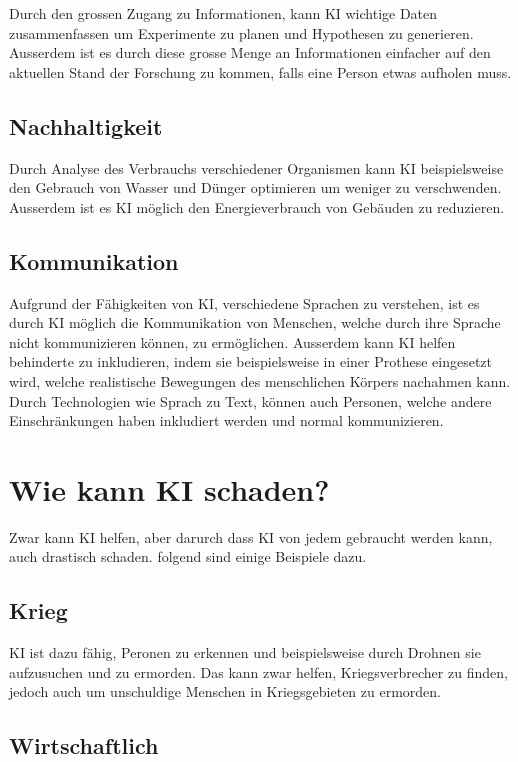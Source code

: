 \documentclass{report}
\begin{document}
Durch den grossen Zugang zu Informationen, kann KI wichtige Daten zusammenfassen um Experimente zu planen und Hypothesen zu generieren. Ausserdem ist es durch diese grosse Menge an Informationen einfacher auf den aktuellen Stand der Forschung zu kommen, falls eine Person etwas aufholen muss. 

\subsection{Nachhaltigkeit}

Durch Analyse des Verbrauchs verschiedener Organismen kann KI beispielsweise den Gebrauch von Wasser und Dünger optimieren um weniger zu verschwenden. Ausserdem ist es KI möglich den Energieverbrauch von Gebäuden zu reduzieren.

\subsection{Kommunikation}

Aufgrund der Fähigkeiten von KI, verschiedene Sprachen zu verstehen, ist es durch KI möglich die Kommunikation von Menschen, welche durch ihre Sprache nicht kommunizieren können, zu ermöglichen. Ausserdem kann KI helfen behinderte zu inkludieren, indem sie beispielsweise in einer Prothese eingesetzt wird, welche realistische Bewegungen des menschlichen Körpers nachahmen kann. Durch Technologien wie Sprach zu Text, können auch Personen, welche andere Einschränkungen haben inkludiert werden und normal kommunizieren.

\section{Wie kann KI schaden?}

Zwar kann KI helfen, aber darurch dass KI von jedem gebraucht werden kann, auch drastisch schaden. folgend sind einige Beispiele dazu.

\subsection{Krieg}

KI ist dazu fähig, Peronen zu erkennen und beispielsweise durch Drohnen sie aufzusuchen und zu ermorden. Das kann zwar helfen, Kriegsverbrecher zu finden, jedoch auch um unschuldige Menschen in Kriegsgebieten zu ermorden. 

\subsection{Wirtschaftlich}
\end{document}
